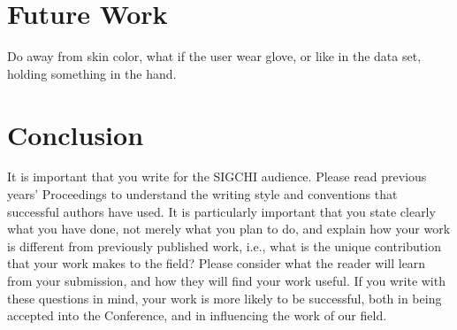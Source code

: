 \documentclass{sigchi}
\begin{document}
\section{Future Work}
Do away from skin color, what if the user wear glove, or like in the data set,
holding something in the hand.

\section{Conclusion}

It is important that you write for the SIGCHI audience.  Please read
previous years' Proceedings to understand the writing style and
conventions that successful authors have used.  It is particularly
important that you state clearly what you have done, not merely what
you plan to do, and explain how your work is different from previously
published work, i.e., what is the unique contribution that your work
makes to the field?  Please consider what the reader will learn from
your submission, and how they will find your work useful.  If you
write with these questions in mind, your work is more likely to be
successful, both in being accepted into the Conference, and in
influencing the work of our field.

%
%
%
%
%
\balance



\end{document}
